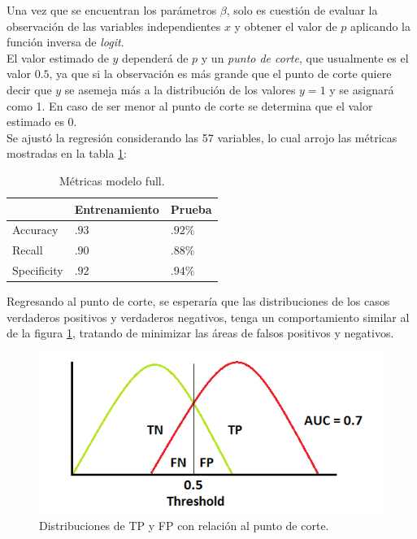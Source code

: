 \documentclass[12pt, letterpaper]{article}
\begin{document}
Una vez que se encuentran los parámetros $\beta$, solo es cuestión de evaluar la observación de las variables independientes $x$ y obtener el valor de $p$ aplicando la función inversa de \emph{logit}.\\

El valor estimado de $y$ dependerá de $p$ y un \emph{punto de corte}, que usualmente es el valor $0.5$, ya que si la observación es más grande que el punto de corte quiere decir que $y$ se asemeja más a la distribución de los valores $y=1$ y se asignará como 1. En caso de ser menor al punto de corte se determina que el valor estimado es 0.\\

Se ajustó la regresión considerando las 57 variables, lo cual arrojo las métricas mostradas en la tabla \ref{log1}:

\begin{table}[ht]
\centering
\begin{tabular}{|l|l|l|}
\hline
&Entrenamiento&Prueba\\
\hline\hline
Accuracy& $.93$ & $.92 \%$ \\ \hline
Recall & $.90$ & $.88 \%$ \\ \hline
Specificity & $.92$ & $.94 \%$ \\ \hline
\end{tabular}
\caption{Métricas modelo full.}
\label{log1}
\end{table}

Regresando al punto de corte, se esperaría que las distribuciones de los casos verdaderos positivos y verdaderos negativos, tenga un comportamiento similar al de la figura \ref{cutoff}, tratando de minimizar las áreas de falsos positivos y negativos.

\begin{figure}
\centering
\includegraphics[scale=.75]{images/punto_de_corte.png} 
\caption{Distribuciones de TP y FP con relación al punto de corte.}
\label{cutoff}
\end{figure}
\end{document}
